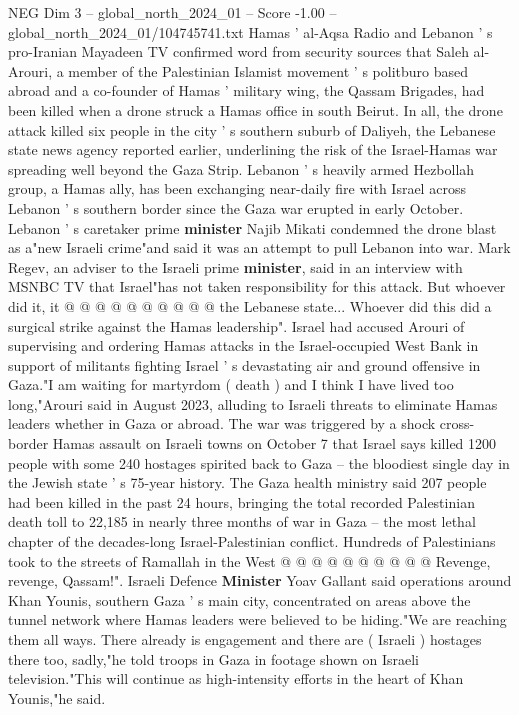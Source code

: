 \begin{textsample}{NEG Dim 3 – global\_north\_2024\_01 – Score -1.00 – global\_north\_2024\_01/104745741.txt}  \label{ex:f3_neg_215}
Hamas ' al-Aqsa Radio and Lebanon ' s pro-Iranian Mayadeen TV confirmed word from security sources that Saleh al-Arouri, a member of the Palestinian Islamist movement ' s politburo based abroad and a co-founder of Hamas ' military wing, the Qassam Brigades, had been killed when a drone struck a Hamas office in south Beirut.
In all, the drone attack killed six people in the city ' s southern suburb of Daliyeh, the Lebanese state news agency reported earlier, underlining the risk of the Israel-Hamas war spreading well beyond the Gaza Strip.
Lebanon ' s heavily armed Hezbollah group, a Hamas ally, has been exchanging near-daily fire with Israel across Lebanon ' s southern border since the Gaza war erupted in early October.
Lebanon ' s caretaker prime \textbf{minister} Najib Mikati condemned the drone blast as a"new Israeli crime"and said it was an attempt to pull Lebanon into war.
Mark Regev, an adviser to the Israeli prime \textbf{minister}, said in an interview with MSNBC TV that Israel"has not taken responsibility for this attack.
But whoever did it, it @ @ @ @ @ @ @ @ @ @ the Lebanese state...
Whoever did this did a surgical strike against the Hamas leadership".
Israel had accused Arouri of supervising and ordering Hamas attacks in the Israel-occupied West Bank in support of militants fighting Israel ' s devastating air and ground offensive in Gaza."I am waiting for martyrdom ( death ) and I think I have lived too long,"Arouri said in August 2023, alluding to Israeli threats to eliminate Hamas leaders whether in Gaza or abroad.
The war was triggered by a shock cross-border Hamas assault on Israeli towns on October 7 that Israel says killed 1200 people with some 240 hostages spirited back to Gaza -- the bloodiest single day in the Jewish state ' s 75-year history.
The Gaza health ministry said 207 people had been killed in the past 24 hours, bringing the total recorded Palestinian death toll to 22,185 in nearly three months of war in Gaza -- the most lethal chapter of the decades-long Israel-Palestinian conflict.
Hundreds of Palestinians took to the streets of Ramallah in the West @ @ @ @ @ @ @ @ @ @ Revenge, revenge, Qassam!".
Israeli Defence \textbf{Minister} Yoav Gallant said operations around Khan Younis, southern Gaza ' s main city, concentrated on areas above the tunnel network where Hamas leaders were believed to be hiding."We are reaching them all ways.
There already is engagement and there are ( Israeli ) hostages there too, sadly,"he told troops in Gaza in footage shown on Israeli television."This will continue as high-intensity efforts in the heart of Khan Younis,"he said.

\end{textsample}
